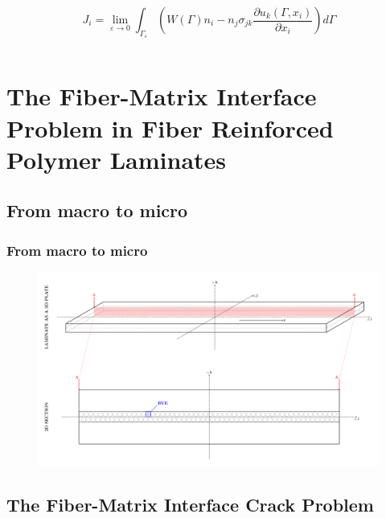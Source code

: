 \documentclass[first,firstsupp,lastsupp,last,hyperref,table]{ETHclass}
\begin{document}
\begin{frame}
\begin{columns}
\begin{column}{0.5\textwidth}
\begin{itemize}[label=]
\begin{equation*}
J_{i}=\lim_{\varepsilon\to 0}\int_{\Gamma_{\varepsilon}}\left(W\left(\Gamma\right)n_{i}-n_{j}\sigma_{jk}\frac{\partial u_{k}\left(\Gamma,x_{i}\right)}{\partial x_{i}}\right)d\Gamma
\end{equation*}

\end{itemize}
\end{column}
\end{columns}
\end{frame}

\section[The Fiber-Matrix Interface Problem in FRPC]{The Fiber-Matrix Interface Problem in Fiber Reinforced Polymer Laminates}

\subsection{From macro to micro}

\begin{frame}
\frametitle{From macro to micro}
\vspace{-1cm}
\centering
\begin{figure}
\centering
\includegraphics[height=0.8\textheight]{laminate-section.pdf}
\label{fig:spread-tow-schematic}
\end{figure}
\end{frame}

\subsection{The Fiber-Matrix Interface Crack Problem}
\end{document}
